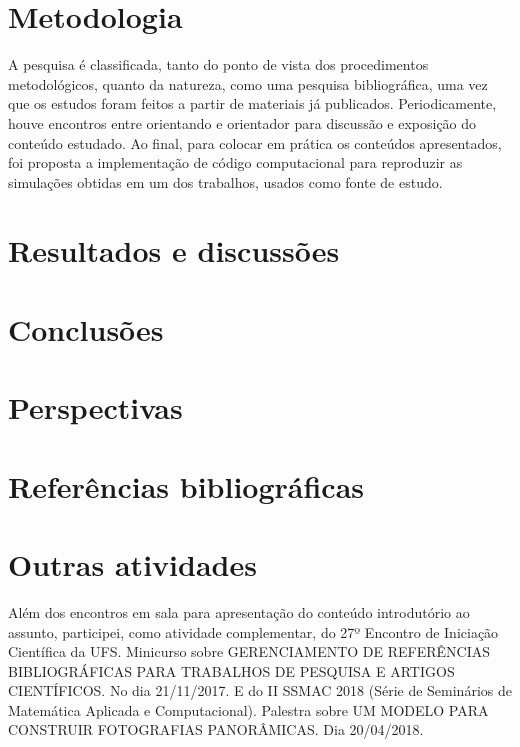 \documentclass[12pt, a4paper]{article}
\begin{document}
\section{Metodologia}

A pesquisa é classificada, tanto do ponto de vista dos procedimentos metodológicos, quanto da natureza, como uma pesquisa bibliográfica, uma vez que os estudos foram feitos a partir de materiais já publicados. Periodicamente, houve encontros entre orientando e orientador para discussão e exposição do conteúdo estudado. Ao final, para colocar em prática os conteúdos apresentados, foi proposta a implementação de código computacional para reproduzir as simulações obtidas em um dos trabalhos, usados como fonte de estudo.
\cite{Burns2014}
\newpage

\section{Resultados e discussões }
\section{Conclusões}
\section{Perspectivas}

\newpage

\section{Referências bibliográficas}

	
\newpage

\section{Outras atividades}
Além dos encontros em sala para apresentação do conteúdo introdutório ao assunto,
participei, como atividade complementar, do 27º Encontro de Iniciação Científica da UFS.
Minicurso sobre GERENCIAMENTO DE REFERÊNCIAS BIBLIOGRÁFICAS PARA
TRABALHOS DE PESQUISA E ARTIGOS CIENTÍFICOS. No dia 21/11/2017. E do II SSMAC 2018 (Série de Seminários de Matemática Aplicada e Computacional). Palestra sobre UM MODELO PARA CONSTRUIR FOTOGRAFIAS PANORÂMICAS. Dia 20/04/2018.\
\end{document}
